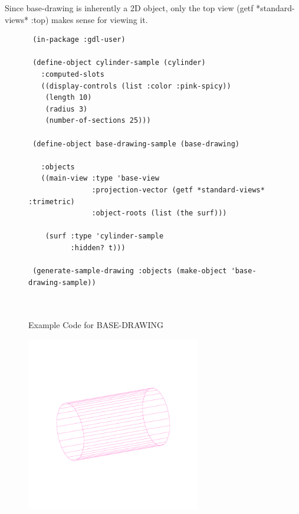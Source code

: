 \documentclass [11pt]{book}
\begin{document}
\begin{itemize}
\begin{description}
Since base-drawing is inherently a 2D object, only the top view (getf *standard-views* :top) 
makes sense for viewing it.



\end{description}




\begin{figure}
\begin{lrbox}{\boxedverb}
\begin{minipage}{\linewidth}
{\small

\begin{verbatim}
 (in-package :gdl-user)

 (define-object cylinder-sample (cylinder)
   :computed-slots
   ((display-controls (list :color :pink-spicy))
    (length 10)
    (radius 3)
    (number-of-sections 25)))

 (define-object base-drawing-sample (base-drawing)
  
   :objects
   ((main-view :type 'base-view
               :projection-vector (getf *standard-views* :trimetric)
               :object-roots (list (the surf)))
 
    (surf :type 'cylinder-sample
          :hidden? t))) 

 (generate-sample-drawing :objects (make-object 'base-drawing-sample))                

 
\end{verbatim}}
\end{minipage}
\end{lrbox}
\fbox{\usebox{\boxedverb}}

\caption{Example Code for BASE-DRAWING}

\label{fig:example-code-BASE-DRAWING}

\end{figure}

\begin{figure}
\begin{center}
\includegraphics[width=3in,height=3in]{../images/example-BASE-DRAWING.pdf}
\end{center}


\end{figure}
\end{itemize}
\end{document}
